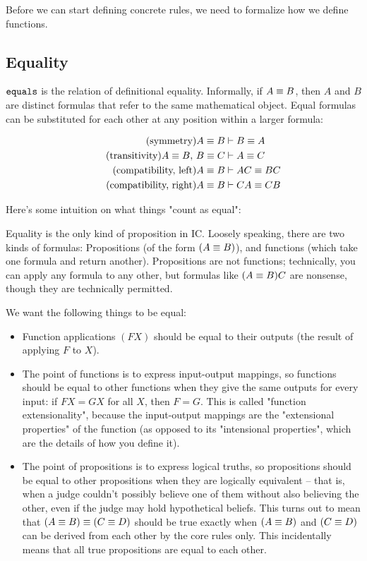 \documentclass{article}
\begin{document}
  Before we can start defining concrete rules, we need to formalize how we define functions.
  
  \fi
  
  \subsection{Equality}
  
  $\operatorname{\texttt{equals}}$ is the relation of definitional equality. Informally, if $A \equiv B$, then $A$ and $B$ are distinct formulas that refer to the same mathematical object. Equal formulas can be substituted for each other at any position within a larger formula:
  
  \begin{align*}
    \tag{symmetry}
    A \equiv B &\vdash B \equiv A \\
    \tag{transitivity}
    A \equiv B ,\, B \equiv C &\vdash A \equiv C \\
    \tag{compatibility, left}
    A \equiv B &\vdash AC \equiv BC \\
    \tag{compatibility, right}
    A \equiv B &\vdash CA \equiv CB
  \end{align*}
  
  Here's some intuition on what things "count as equal":
  
  Equality is the only kind of proposition in IC. Loosely speaking, there are two kinds of formulas: Propositions (of the form $(A \equiv B)$), and functions (which take one formula and return another). Propositions are not functions; technically, you can apply any formula to any other, but formulas like $(A \equiv B)C$ are nonsense, though they are technically permitted.
  
  We want the following things to be equal:
  
  \begin{itemize}
    \item Function applications $(FX)$ should be equal to their outputs (the result of applying $F$ to $X$).
    \item The point of functions is to express input-output mappings, so functions should be equal to other functions when they give the same outputs for every input: if $FX = GX$ for all $X$, then $F = G$. This is called "function extensionality", because the input-output mappings are the "extensional properties" of the function (as opposed to its "intensional properties", which are the details of how you define it).
    \item The point of propositions is to express logical truths, so propositions should be equal to other propositions when they are logically equivalent – that is, when a judge couldn't possibly believe one of them without also believing the other, even if the judge may hold hypothetical beliefs. This turns out to mean that $(A \equiv B) \equiv (C \equiv D)$ should be true exactly when $(A \equiv B)$ and $(C \equiv D)$ can be derived from each other by the core rules only. This incidentally means that all true propositions are equal to each other.
  \end{itemize}
  
\end{document}
